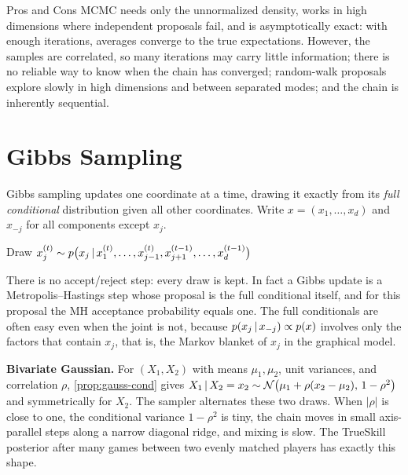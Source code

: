 \begin{notebox}{Pros and Cons}
MCMC needs only the unnormalized density, works in high dimensions where independent proposals fail, and is asymptotically exact: with enough iterations, averages converge to the true expectations. However, the samples are correlated, so many iterations may carry little information; there is no reliable way to know when the chain has converged; random-walk proposals explore slowly in high dimensions and between separated modes; and the chain is inherently sequential.
\end{notebox}

\section{Gibbs Sampling}\label{sec:gibbs}

Gibbs sampling updates one coordinate at a time, drawing it exactly from its \emph{full conditional} distribution given all other coordinates. Write $x=(x_1,\dots,x_d)$ and $x_{-j}$ for all components except $x_j$.

\begin{algorithm}[H]
\caption{Gibbs Sampling}\label{alg:gibbs}
\begin{algorithmic}[1]
    \State Draw $x_j^{(t)}\sim p\big(x_j\,|\, x_1^{(t)},\dots,x_{j-1}^{(t)},x_{j+1}^{(t-1)},\dots,x_d^{(t-1)}\big)$ 
  \EndFor
\EndFor
{}
\end{algorithmic}
\end{algorithm}

There is no accept/reject step: every draw is kept. In fact a Gibbs update is a Metropolis--Hastings step whose proposal is the full conditional itself, and for this proposal the MH acceptance probability equals one. The full conditionals are often easy even when the joint is not, because $p(x_j\,|\, x_{-j})\propto p(x)$ involves only the factors that contain $x_j$, that is, the Markov blanket of $x_j$ in the graphical model.

\smallskip\noindent\textbf{Bivariate Gaussian.} For $(X_1,X_2)$ with means $\mu_1,\mu_2$, unit variances, and correlation $\rho$, \cref{prop:gauss-cond} gives $X_1\,|\, X_2=x_2\sim\mathcal{N}\big(\mu_1+\rho(x_2-\mu_2),\,1-\rho^2\big)$ and symmetrically for $X_2$. The sampler alternates these two draws. When $|\rho|$ is close to one, the conditional variance $1-\rho^2$ is tiny, the chain moves in small axis-parallel steps along a narrow diagonal ridge, and mixing is slow. The TrueSkill posterior after many games between two evenly matched players has exactly this shape.

